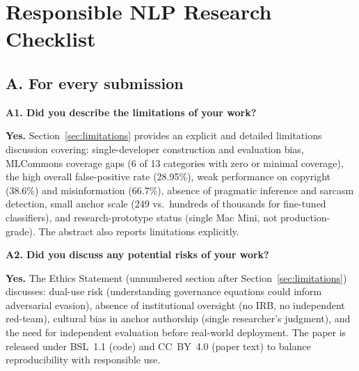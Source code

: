 %
%

\section*{Responsible NLP Research Checklist}


\subsection*{A. For every submission}

\textbf{A1. Did you describe the limitations of your work?}

\textbf{Yes.} Section~\ref{sec:limitations} provides an explicit and detailed limitations discussion covering: single-developer construction and evaluation bias, MLCommons coverage gaps (6 of 13 categories with zero or minimal coverage), the high overall false-positive rate (28.95\%), weak performance on copyright (38.6\%) and misinformation (66.7\%), absence of pragmatic inference and sarcasm detection, small anchor scale (249 vs.\ hundreds of thousands for fine-tuned classifiers), and research-prototype status (single Mac Mini, not production-grade). The abstract also reports limitations explicitly.

\textbf{A2. Did you discuss any potential risks of your work?}

\textbf{Yes.} The Ethics Statement (unnumbered section after Section~\ref{sec:limitations}) discusses: dual-use risk (understanding governance equations could inform adversarial evasion), absence of institutional oversight (no IRB, no independent red-team), cultural bias in anchor authorship (single researcher's judgment), and the need for independent evaluation before real-world deployment. The paper is released under BSL~1.1 (code) and CC~BY~4.0 (paper text) to balance reproducibility with responsible use.

